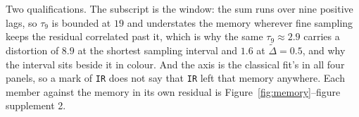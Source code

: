 Two qualifications. The subscript is the window: the sum runs over nine positive lags, so $\tau_{9}$ is
bounded at $19$ and understates the memory wherever fine sampling keeps the residual correlated
past it, which is why the same $\tau_{9}\approx2.9$ carries a distortion of $8.9$ at the shortest
sampling interval and $1.6$ at $\widetilde{\Delta}=0.5$, and why the interval sits beside it in
colour. And the axis is the classical fit's in all four panels, so a mark of \texttt{IR} does not
say that \texttt{IR} left that memory anywhere. Each member against the memory in its own residual
is Figure~\ref{fig:memory}--figure supplement 2.
%
%


